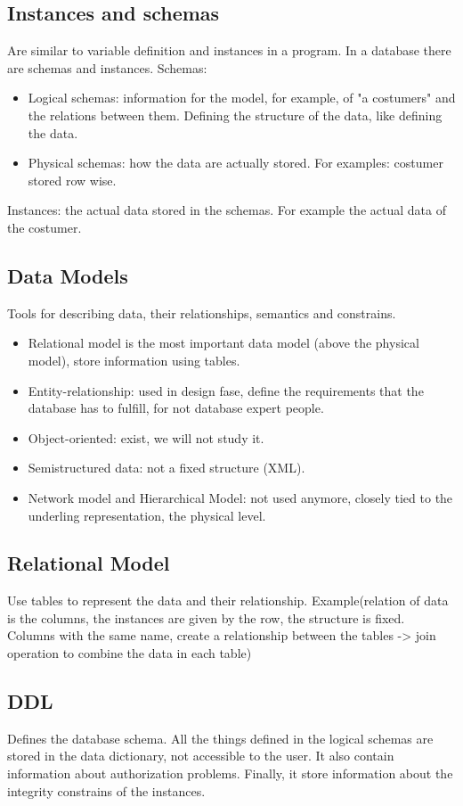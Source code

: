 \documentclass[11pt]{report}
\theoremstyle{definition}
\theoremstyle{remark}
\begin{document}
\subsection*{Instances and schemas}

Are similar to variable definition  and instances in a program.
In a database there are schemas and instances.
Schemas:
\begin{itemize}
    \item Logical schemas: information for the model, for example, of "a costumers" and the relations between them. Defining the structure of the data, like defining the data.
    \item Physical schemas: how the data are actually stored. For examples: costumer stored row wise. 
\end{itemize}
Instances: the actual data stored in the schemas. For example the actual data of the costumer. 
\subsection*{Data Models}
Tools for describing data, their relationships, semantics and constrains.
\begin{itemize}
    \item Relational model is the most important data model (above the physical model), store information using tables.
    \item Entity-relationship: used in design fase, define the requirements that the database has to fulfill, for not database expert people.
    \item Object-oriented: exist, we will not study it.
    \item Semistructured data: not a fixed structure (XML).
    \item Network model and Hierarchical Model: not used anymore, closely tied to the underling representation, the physical level.  
\end{itemize}

\subsection*{Relational Model}
Use tables to represent the data and their relationship. Example(relation of data is the columns, the instances are given by the row, the structure is fixed. Columns with the same name, create a relationship between the tables -> join operation to combine the data in each table)


\subsection*{DDL}
Defines the database schema.
All the things defined in the logical schemas are stored in the data dictionary, not accessible to the user. It also contain information about authorization problems. Finally, it store information about the integrity constrains of the instances.
\end{document}
